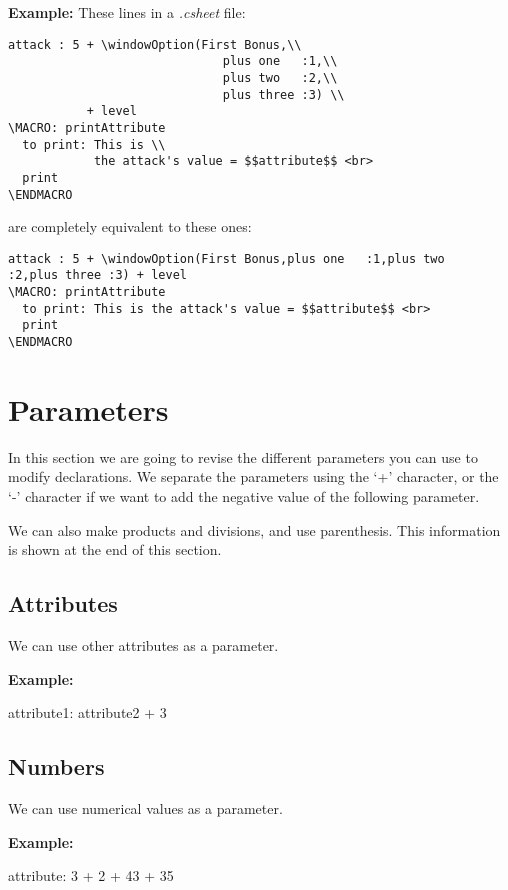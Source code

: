 \documentclass[11pt,a4paper,openright,oneside]{book}
\newenvironment{ex}
{
  \setlength{\parindent}{0cm}
  \large \textbf{Example:} \normalsize 
}
{}
\begin{document}
\begin{ex} These lines in a \textit{.csheet} file:
  \scriptsize
  \begin{lstlisting}
attack : 5 + \windowOption(First Bonus,\\
                              plus one   :1,\\
                              plus two   :2,\\
                              plus three :3) \\
           + level
\MACRO: printAttribute
  to print: This is \\
            the attack's value = $$attribute$$ <br>
  print
\ENDMACRO
  \end{lstlisting}
  \normalsize
are completely equivalent to these ones:
  \scriptsize
  \begin{lstlisting}
attack : 5 + \windowOption(First Bonus,plus one   :1,plus two   :2,plus three :3) + level
\MACRO: printAttribute
  to print: This is the attack's value = $$attribute$$ <br>
  print
\ENDMACRO
  \end{lstlisting}
  \normalsize
\end{ex}

\chapter{Parameters}
In this section we are going to revise the different parameters you can use to modify declarations. We separate the parameters using the `\textsf{+}' character, or the `\textsf{-}' character if we want to add the negative value of the following parameter.

We can also make products and divisions, and use parenthesis. This information is shown at the end of this section.

\section{Attributes}
  We can use other attributes as a parameter.

  \begin{ex}
  \textsf{attribute1: attribute2 + 3}
  \end{ex}

\section{Numbers}  
  We can use numerical values as a parameter. 

  \begin{ex}
  \textsf{attribute: 3 + 2 + 43 + 35}
  \end{ex}
\end{document}

